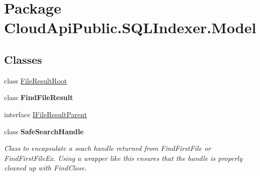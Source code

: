 \hypertarget{namespace_cloud_api_public_1_1_s_q_l_indexer_1_1_model}{\section{Package Cloud\-Api\-Public.\-S\-Q\-L\-Indexer.\-Model}
\label{namespace_cloud_api_public_1_1_s_q_l_indexer_1_1_model}
}
\subsection*{Classes}
\begin{DoxyCompactItemize}
\item 
class \hyperlink{class_cloud_api_public_1_1_s_q_l_indexer_1_1_model_1_1_file_result_root}{File\-Result\-Root}
\item 
class {\bfseries Find\-File\-Result}
\item 
interface \hyperlink{interface_cloud_api_public_1_1_s_q_l_indexer_1_1_model_1_1_i_file_result_parent}{I\-File\-Result\-Parent}
\item 
class {\bfseries Safe\-Search\-Handle}
\begin{DoxyCompactList}\small\item\em Class to encapsulate a seach handle returned from Find\-First\-File or Find\-First\-File\-Ex. Using a wrapper like this ensures that the handle is properly cleaned up with Find\-Close. \end{DoxyCompactList}\end{DoxyCompactItemize}

